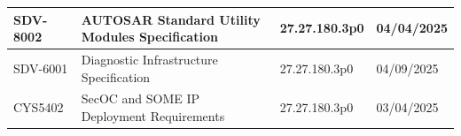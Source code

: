 \begin{longtable}{|l|l|l|l|}
\begin{minipage}{0.35\linewidth}\raggedright\vspace{.75ex}SDV-8002\vspace{.75ex}\end{minipage} & \begin{minipage}{0.22\linewidth}\raggedright\vspace{.75ex} AUTOSAR Standard Utility Modules Specification\vspace{.75ex}\end{minipage} & \begin{minipage}{0.18\linewidth}\raggedright\vspace{.75ex}27.27.180.3p0\vspace{.75ex}\end{minipage} & \begin{minipage}{0.13\linewidth}\raggedright\vspace{.75ex}04/04/2025\vspace{.75ex}\end{minipage}\\\hline
\begin{minipage}{0.35\linewidth}\raggedright\vspace{.75ex}SDV-6001\vspace{.75ex}\end{minipage} & \begin{minipage}{0.22\linewidth}\raggedright\vspace{.75ex} Diagnostic Infrastructure Specification\vspace{.75ex}\end{minipage} & \begin{minipage}{0.18\linewidth}\raggedright\vspace{.75ex}27.27.180.3p0\vspace{.75ex}\end{minipage} & \begin{minipage}{0.13\linewidth}\raggedright\vspace{.75ex}04/09/2025\vspace{.75ex}\end{minipage}\\\hline
\begin{minipage}{0.35\linewidth}\raggedright\vspace{.75ex}CYS5402\vspace{.75ex}\end{minipage} & \begin{minipage}{0.22\linewidth}\raggedright\vspace{.75ex} SecOC and SOME IP Deployment Requirements\vspace{.75ex}\end{minipage} & \begin{minipage}{0.18\linewidth}\raggedright\vspace{.75ex}27.27.180.3p0\vspace{.75ex}\end{minipage} & \begin{minipage}{0.13\linewidth}\raggedright\vspace{.75ex}03/04/2025\vspace{.75ex}\end{minipage}\\\hline
\end{longtable}